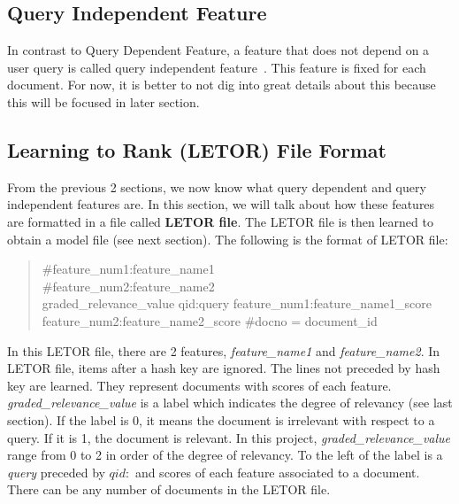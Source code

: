 \subsection{Query Independent Feature}\label{section:queryindependent}
In contrast to Query Dependent Feature, a feature that does not depend on a user query is called query independent feature~\cite{craig}. This feature is fixed for each
document. For now, it is better to not dig into great details about this because this will be focused in later section.

\subsection{Learning to Rank (LETOR) File Format}\label{sec:letorFile}
From the previous 2 sections, we now know what query dependent and query independent features are. In this section, we will talk about how these features
are formatted in a file called \textbf{LETOR file}. The LETOR file is then learned to obtain a model file (see next section).
The following is the format of LETOR file:

\begin{quotation}
\noindent\#feature\_num1:feature\_name1 \\
\#feature\_num2:feature\_name2 \\
graded\_relevance\_value qid:query feature\_num1:feature\_name1\_score feature\_num2:feature\_name2\_score \#docno = document\_id
\end{quotation}

In this LETOR file, there are 2 features, \textit{feature\_name1} and \textit{feature\_name2}. In LETOR file, items after a hash key are ignored.
The lines not preceded by hash key are learned. They represent documents with scores
of each feature. \textit{graded\_relevance\_value} is a label which indicates the degree of relevancy (see last section).
If the label is 0, it means the document is irrelevant with respect to a query. If it is 1, the document is relevant. 
In this project, \textit{graded\_relevance\_value} range from 0 to 2 in order of 
the degree of relevancy. To the left of the label is a \textit{query} preceded by \textit{$qid:$} and scores of each feature associated to a document.
There can be any number of documents in the LETOR file.

